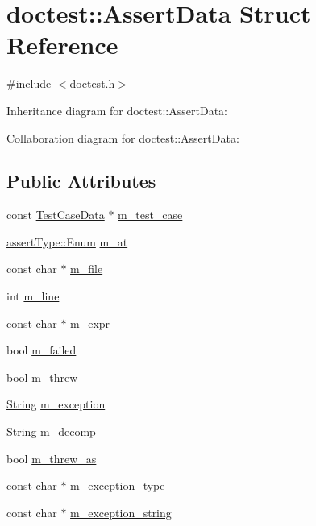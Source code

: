 \hypertarget{structdoctest_1_1_assert_data}{}\section{doctest\+:\+:Assert\+Data Struct Reference}
\label{structdoctest_1_1_assert_data}


{\ttfamily \#include $<$doctest.\+h$>$}



Inheritance diagram for doctest\+:\+:Assert\+Data\+:


Collaboration diagram for doctest\+:\+:Assert\+Data\+:
\subsection*{Public Attributes}
\begin{DoxyCompactItemize}
\item 
const \hyperlink{structdoctest_1_1_test_case_data}{Test\+Case\+Data} $\ast$ \hyperlink{structdoctest_1_1_assert_data_ab26ee6e05feaefc982c4f5481458cbda}{m\+\_\+test\+\_\+case}
\item 
\hyperlink{namespacedoctest_1_1assert_type_ae1bb5bed722f34f1c38b83cb19d326d3}{assert\+Type\+::\+Enum} \hyperlink{structdoctest_1_1_assert_data_a0b3b2866b13ba048c0beea51bd798749}{m\+\_\+at}
\item 
const char $\ast$ \hyperlink{structdoctest_1_1_assert_data_ac22c9ed0d8c6edec58c4b26a0a00e714}{m\+\_\+file}
\item 
int \hyperlink{structdoctest_1_1_assert_data_a1142f5fb5d171964b7677a9d23f81548}{m\+\_\+line}
\item 
const char $\ast$ \hyperlink{structdoctest_1_1_assert_data_af8fe9e24ffba3f575c7384a85f96297a}{m\+\_\+expr}
\item 
bool \hyperlink{structdoctest_1_1_assert_data_ac9ddaf3e6532fdadba3c1f74eb931d4a}{m\+\_\+failed}
\item 
bool \hyperlink{structdoctest_1_1_assert_data_a3e9d4c7eeff7c4fe310b0597bf7027b8}{m\+\_\+threw}
\item 
\hyperlink{classdoctest_1_1_string}{String} \hyperlink{structdoctest_1_1_assert_data_a1fdbef933ef26c0bc174f9ec716924cd}{m\+\_\+exception}
\item 
\hyperlink{classdoctest_1_1_string}{String} \hyperlink{structdoctest_1_1_assert_data_a1c6b5804b7dd4d8ba70126cb598f30bd}{m\+\_\+decomp}
\item 
bool \hyperlink{structdoctest_1_1_assert_data_ace744d365532d299052c8a80a63f7079}{m\+\_\+threw\+\_\+as}
\item 
const char $\ast$ \hyperlink{structdoctest_1_1_assert_data_a1c476dc606780aefdb7db2d7ca146199}{m\+\_\+exception\+\_\+type}
\item 
const char $\ast$ \hyperlink{structdoctest_1_1_assert_data_aa01e5c79855d78e3612b6d77a0fef54b}{m\+\_\+exception\+\_\+string}
\end{DoxyCompactItemize}



